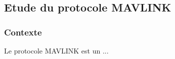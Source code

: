 \subsection{Etude du protocole MAVLINK }

\subsubsection{Contexte}

Le protocole MAVLINK est un ...

